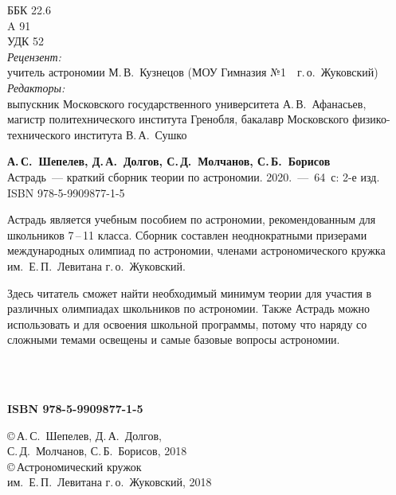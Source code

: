 \newpage
\setcounter{page}{2}
\thispagestyle{empty}
	ББК 22.6\\
	\hspace*{1.8pc} A 91\\
	УДК 52\\[1pc]

{\small {\itshape Рецензент:}\\ учитель астрономии М.\,В.~Кузнецов (МОУ Гимназия №1~~г.\,о.~Жуковский)}\\[1pc]

{\small {\itshape Редакторы:}\\ 
выпускник Московского государственного университета А.\,В.~Афанасьев,\\
магистр политехнического института Гренобля, бакалавр Московского физико-тех\-ни\-чес\-кого института В.\,А.~Сушко\\[1pc]}


{\hspace{1pc} {\bfseries А.\,С.~Шепелев, Д.\,А.~Долгов, С.\,Д.~Молчанов, С.\,Б.~Борисов}\\ Астрадь~--- краткий сборник теории по астрономии. 2020.~---~64~с: 2-е изд.}\\ 
ISBN 978-5-9909877-1-5\\[2pc]

\hspace{1pc} {\small Астрадь является учебным пособием по астрономии, рекомендованным для школьников 7\,--\,11 класса. Сборник составлен неоднократными призерами международных олимпиад по астрономии, членами астрономического кружка им.~Е.\,П.~Левитана г.\,о.~Жуковский. 

\hspace{1pc} Здесь читатель сможет найти необходимый минимум теории для участия в различных олимпиадах школьников по астрономии. Также Астрадь можно использовать и для освоения школьной программы, потому что наряду со сложными темами освещены и самые базовые вопросы астрономии.}\\[1pc]

\\ \vfill


\begin{minipage}[t]{0.4\tw}
	{\bfseries ISBN 978-5-9909877-1-5}
\end{minipage}
\hfill
\begin{minipage}[t]{0.57\tw}
	\small
	\copyright\,А.\,С.~Шепелев, Д.\,А.~Долгов,\\
	 \hspace*{8pt} С.\,Д.~Молчанов, С.\,Б.~Борисов, 2018\\[3pt]
	\copyright\,Астрономический кружок\\ \hspace*{8pt} им.~Е.\,П.~Левитана г.\,о.~Жуковский, 2018
\end{minipage}
\newpage